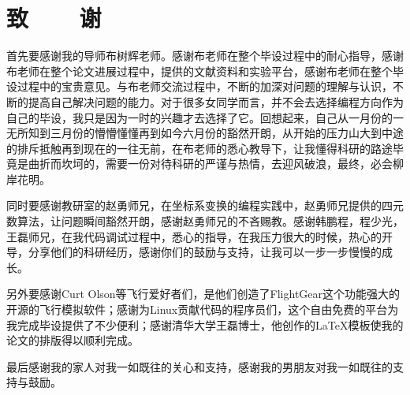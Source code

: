 

\renewcommand{\baselinestretch}{1.5}
\fontsize{12pt}{13pt}\selectfont

\chapter*{致~~~~谢}

首先要感谢我的导师布树辉老师。感谢布老师在整个毕设过程中的耐心指导，感谢布老师在整个论文进展过程中，提供的文献资料和实验平台，感谢布老师在整个毕设过程中的宝贵意见。与布老师交流过程中，不断的加深对问题的理解与认识，不断的提高自己解决问题的能力。对于很多女同学而言，并不会去选择编程方向作为自己的毕设，我只是因为一时的兴趣才去选择了它。回想起来，自己从一月份的一无所知到三月份的懵懵懂懂再到如今六月份的豁然开朗，从开始的压力山大到中途的排斥抵触再到现在的一往无前，在布老师的悉心教导下，让我懂得科研的路途毕竟是曲折而坎坷的，需要一份对待科研的严谨与热情，去迎风破浪，最终，必会柳岸花明。

同时要感谢教研室的赵勇师兄，在坐标系变换的编程实践中，赵勇师兄提供的四元数算法，让问题瞬间豁然开朗，感谢赵勇师兄的不吝赐教。感谢韩鹏程，程少光，王磊师兄，在我代码调试过程中，悉心的指导，在我压力很大的时候，热心的开导，分享他们的科研经历，感谢你们的鼓励与支持，让我可以一步一步慢慢的成长。

另外要感谢Curt Olson等飞行爱好者们，是他们创造了FlightGear这个功能强大的开源的飞行模拟软件；感谢为Linux贡献代码的程序员们，这个自由免费的平台为我完成毕设提供了不少便利；感谢清华大学王磊博士，他创作的\LaTeX 模板使我的论文的排版得以顺利完成。

最后感谢我的家人对我一如既往的关心和支持，感谢我的男朋友对我一如既往的支持与鼓励。
